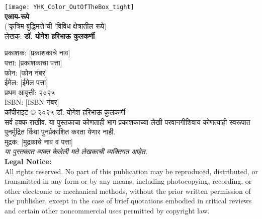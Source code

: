 

\thispagestyle{empty}
\null\vfill

\begin{center}
\texttt{[image: YHK\_Color\_OutOfTheBox\_tight]} \\[1.5em]

\textbf{\Large एआय-रूपे}\\ [0.5em]
('कृत्रिम बुद्धिमत्ते'ची 'विविध क्षेत्रातील रूपे)\\[0.5em]

लेखक: \textbf{डॉ. योगेश हरिभाऊ कुलकर्णी}\\[2.5em]
\end{center}

\begin{flushleft}

प्रकाशक: [प्रकाशकाचे नाव]\\
पत्ता: [प्रकाशकाचा पत्ता]\\
फोन: [फोन नंबर]\\
ईमेल: [ईमेल पत्ता]\\[2.5em]

प्रथम आवृत्ती: २०२५\\[0.5em]

ISBN: [ISBN नंबर]\\[0.5em]

कॉपीराइट © २०२५ डॉ. योगेश हरिभाऊ कुलकर्णी\\[0.5em]

सर्व हक्क राखीव. या पुस्तकाचा कोणताही भाग प्रकाशकाच्या लेखी परवानगीशिवाय कोणत्याही स्वरूपात पुनर्मुद्रित किंवा पुनर्प्रकाशित करता येणार नाही.\\[2.5em]

मुद्रक: [मुद्रकाचे नाव व पत्ता]\\[0.5em]

\textit{या पुस्तकात व्यक्त केलेली मते लेखकाची व्यक्तिगत आहेत.}\\[2.5em]

\textbf{Legal Notice:}\\
All rights reserved. No part of this publication may be reproduced, distributed, or transmitted in any form or by any means, including photocopying, recording, or other electronic or mechanical methods, without the prior written permission of the publisher, except in the case of brief quotations embodied in critical reviews and certain other noncommercial uses permitted by copyright law.
\end{flushleft}
\vfill\null
\clearpage